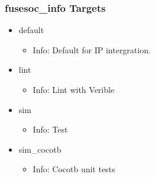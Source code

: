\subsubsection{fusesoc\_info Targets}
\begin{itemize}
\item default
	\begin{itemize}
	\item[$\space$] Info: Default for IP intergration.
	\end{itemize}
\item lint
	\begin{itemize}
	\item[$\space$] Info: Lint with Verible
	\end{itemize}
\item sim
	\begin{itemize}
	\item[$\space$] Info: Test
	\end{itemize}
\item sim\_cocotb
	\begin{itemize}
	\item[$\space$] Info: Cocotb unit tests
	\end{itemize}
\end{itemize}
